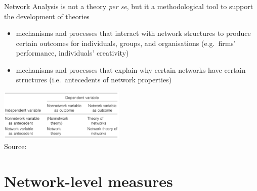\documentclass[8pt]{beamer}
\begin{document}

\begin{frame}
\frametitle{\insertsection}

Network Analysis is not a theory \textit{per se}, but it a methodological tool to support the development of theories \cite{Borgatti2011}

\begin{itemize}
    \item {\color{blue}{Network theory:}} mechanisms and processes that interact with network structures to produce certain outcomes for individuals, groups, and organisations (e.g.\ firms' performance, individuals' creativity)	
    
    \medskip
    
    \item {\color{blue}{Theory of networks:}} mechanisms and processes that explain why certain networks have certain structures (i.e.\ antecedents of network properties)
\end{itemize}

\medskip

\centering
\includegraphics[width=6cm]{borgatti}\\
\tiny{Source: \cite{Borgatti2011}}
\end{frame}





\section{Network-level measures}

\bgroup
{}
\begin{frame}[plain]{}
\begin{center}
\color{white}{\Huge\insertsection}
\end{center}
\end{frame}
\egroup
\end{document}
